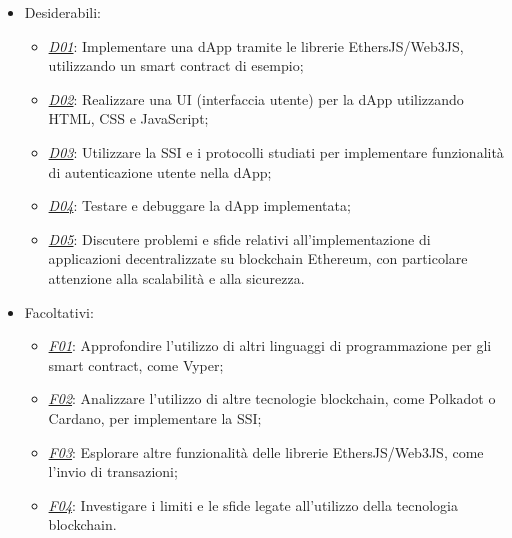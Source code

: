 \begin{itemize}
    \item Desiderabili:
        \begin{itemize}
            \item \underline{\textit{D01}}: Implementare una dApp tramite le librerie EthersJS/Web3JS, utilizzando un smart contract di esempio;
            \item \underline{\textit{D02}}: Realizzare una UI (interfaccia utente) per la dApp utilizzando HTML, CSS e JavaScript;
            \item \underline{\textit{D03}}: Utilizzare la SSI e i protocolli studiati per implementare funzionalità di autenticazione utente nella dApp;
            \item \underline{\textit{D04}}: Testare e debuggare la dApp implementata;
            \item \underline{\textit{D05}}: Discutere problemi e sfide relativi all'implementazione di applicazioni decentralizzate su blockchain Ethereum, con particolare attenzione alla scalabilità e alla sicurezza.
        \end{itemize}

    \item Facoltativi:
        \begin{itemize}
            \item \underline{\textit{F01}}: Approfondire l'utilizzo di altri linguaggi di programmazione per gli smart contract, come Vyper;
            \item \underline{\textit{F02}}: Analizzare l'utilizzo di altre tecnologie blockchain, come Polkadot o Cardano, per implementare la SSI;
            \item \underline{\textit{F03}}: Esplorare altre funzionalità delle librerie EthersJS/Web3JS, come l'invio di transazioni;
            \item \underline{\textit{F04}}: Investigare i limiti e le sfide legate all'utilizzo della tecnologia blockchain.
        \end{itemize}
    
\end{itemize}

